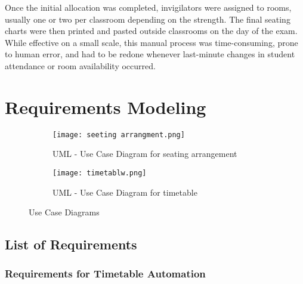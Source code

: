 \documentclass[12pt]{article}
\begin{document}
Once the initial allocation was completed, invigilators were assigned to rooms, usually one or two per classroom depending on the strength. The final seating charts were then printed and pasted outside classrooms on the day of the exam. While effective on a small scale, this manual process was time-consuming, prone to human error, and had to be redone whenever last-minute changes in student attendance or room availability occurred.
\section{Requirements Modeling}
\begin{figure}[h!]
    \centering
    \begin{subfigure}[b]{0.48\textwidth}
        \centering
        \texttt{[image: seeting arrangment.png]}
        \caption{UML - Use Case Diagram for seating arrangement}
        \label{fig:uml_seating}
    \end{subfigure}
    \hfill
    \begin{subfigure}[b]{0.48\textwidth}
        \centering
        \texttt{[image: timetablw.png]}
        \caption{UML - Use Case Diagram for timetable}
        \label{fig:uml_timetable}
    \end{subfigure}
    \caption{Use Case Diagrams}
    \label{fig:uml_side_by_side}
\end{figure}


\subsection{List of Requirements}  
 
\subsubsection{Requirements for Timetable Automation}
\end{document}
